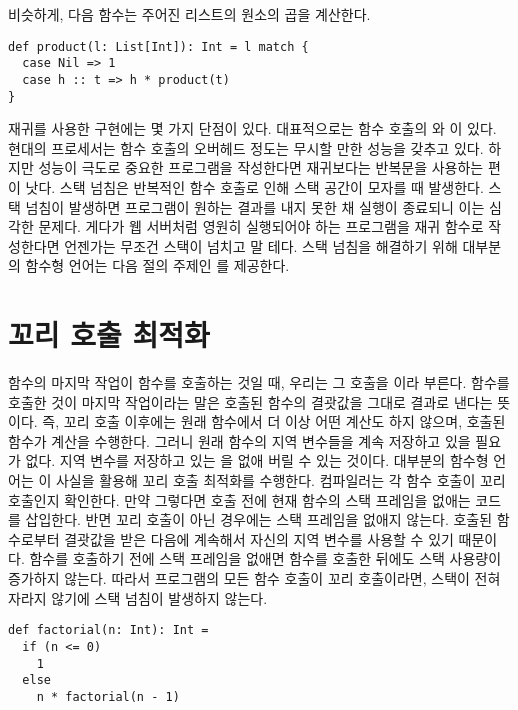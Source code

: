 비슷하게, 다음 함수는 주어진 리스트의 원소의 곱을 계산한다.

\begin{verbatim}
def product(l: List[Int]): Int = l match {
  case Nil => 1
  case h :: t => h * product(t)
}
\end{verbatim}

재귀를 사용한 구현에는 몇 가지 단점이 있다. 대표적으로는 함수 호출의
와 이 있다. 현대의
프로세서는 함수 호출의
오버헤드 정도는 무시할 만한 성능을 갖추고 있다. 하지만 성능이 극도로 중요한
프로그램을 작성한다면 재귀보다는 반복문을 사용하는 편이 낫다. 스택 넘침은
반복적인 함수 호출로 인해 스택 공간이 모자를 때 발생한다. 스택 넘침이 발생하면
프로그램이 원하는 결과를 내지 못한 채 실행이 종료되니 이는 심각한 문제다. 게다가
웹 서버처럼 영원히 실행되어야 하는 프로그램을 재귀 함수로 작성한다면 언젠가는
무조건 스택이 넘치고 말 테다. 스택 넘침을 해결하기 위해 대부분의 함수형 언어는
다음 절의 주제인 를 제공한다.

\section{꼬리 호출 최적화}

함수의 마지막 작업이 함수를 호출하는 것일 때, 우리는 그 호출을
이라 부른다. 함수를 호출한 것이 마지막 작업이라는 말은 호출된 함수의
결괏값을 그대로 결과로 낸다는 뜻이다. 즉, 꼬리 호출 이후에는 원래 함수에서 더
이상 어떤 계산도 하지 않으며, 호출된 함수가 계산을 수행한다. 그러니 원래 함수의
지역 변수들을 계속 저장하고 있을 필요가 없다. 지역 변수를 저장하고 있는
을 없애 버릴 수 있는 것이다. 대부분의 함수형 언어는 이 사실을
활용해 꼬리 호출 최적화를 수행한다. 컴파일러는 각 함수 호출이 꼬리 호출인지
확인한다. 만약 그렇다면 호출 전에 현재 함수의 스택 프레임을 없애는 코드를
삽입한다. 반면 꼬리 호출이 아닌 경우에는 스택 프레임을 없애지 않는다. 호출된
함수로부터 결괏값을 받은 다음에 계속해서 자신의 지역 변수를 사용할 수 있기
때문이다. 함수를 호출하기 전에 스택 프레임을 없애면 함수를 호출한 뒤에도 스택
사용량이 증가하지 않는다. 따라서 프로그램의 모든 함수 호출이 꼬리 호출이라면,
스택이 전혀 자라지 않기에 스택 넘침이 발생하지 않는다.

\begin{verbatim}
def factorial(n: Int): Int =
  if (n <= 0)
    1
  else
    n * factorial(n - 1)
\end{verbatim}

